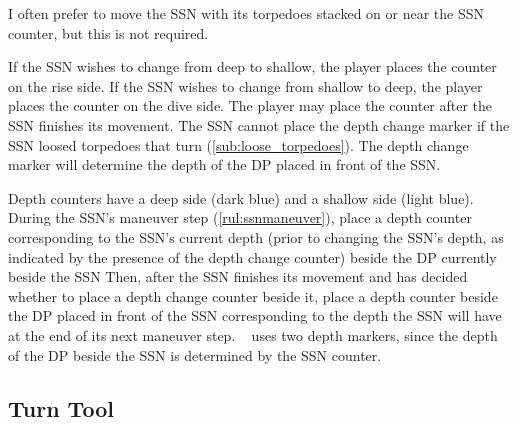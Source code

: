 \documentclass[../TacSubMicroRules.tex]{subfiles}
\begin{document}
\begin{design}
    I often prefer to move the SSN with its torpedoes stacked on or near the SSN counter, but this is not required.
\end{design}

 
If the SSN wishes to change from deep to shallow, the player places the counter on the rise side.
If the SSN wishes to change from shallow to deep, the player places the counter on the dive side.
The player may place the counter after the SSN finishes its movement.
The SSN cannot place the depth change marker if the SSN loosed torpedoes that turn (\ref{sub:loose_torpedoes}).
The depth change marker will determine the depth of the DP placed in front of the  SSN.

 Depth counters have a deep side (dark blue) and a shallow side (light blue).
During the SSN's maneuver step (\ref{rul:ssnmaneuver}), place a depth counter corresponding to the SSN's current depth (prior to changing the SSN's depth, as indicated by the presence of the depth change counter) beside the DP currently beside the SSN
Then, after the SSN finishes its movement and has decided whether to place a depth change counter beside it, place a depth counter beside the DP placed in front of the SSN corresponding to the depth the SSN will have at the end of its next maneuver step.
\gametitle~ uses two depth markers, since the depth of the DP beside the SSN is determined by the SSN counter.

\subsection{Turn Tool}%
\label{sub:turn_tool}
\end{document}
